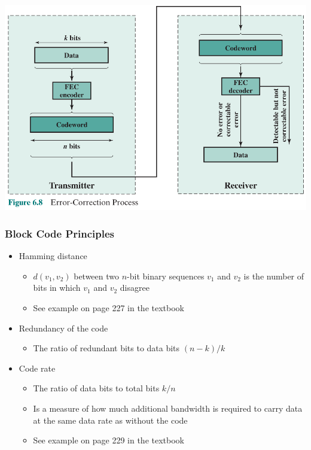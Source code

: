 \documentclass[pdflatex,compress]{beamer}
\begin{document}
\begin{frame}
	\begin{center}
		\includegraphics[width=\linewidth]{img/img08}
	\end{center}
\end{frame}

\begin{frame}
	\frametitle{Block Code Principles}
	\begin{itemize}
		\item Hamming distance
		\begin{itemize}
			\item $ d(v_1, v_2) $ between two $ n $-bit binary sequences $ v_1 $ and $ v_2 $ is the number of bits in which $ v_1 $ and $ v_2 $ disagree
			\item See example on page 227 in the textbook
		\end{itemize}
		\item Redundancy of the code
		\begin{itemize}
			\item The ratio of redundant bits to data bits $ (n-k)/k $
		\end{itemize}
		\item Code rate
		\begin{itemize}
			\item The ratio of data bits to total bits $ k/n $
			\item Is a measure of how much additional bandwidth is required to carry data at the same data rate as without the code
			\item See example on page 229 in the textbook
		\end{itemize}
	\end{itemize}
\end{frame}
\end{document}
